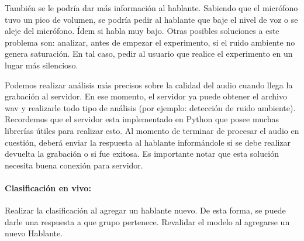 También se le podría dar más información al hablante. Sabiendo que el micrófono tuvo un pico de volumen, se podría pedir al hablante que baje el nivel de voz o se aleje del micrófono. Ídem si habla muy bajo. Otras posibles soluciones a este problema son: analizar, antes de empezar el experimento, si el ruido ambiente no genera saturación. En tal caso, pedir al usuario que realice el experimento en un lugar más silencioso. 

Podemos realizar análisis más precisos sobre la calidad del audio cuando llega la grabación al servidor. En ese momento, el servidor ya puede obtener el archivo wav y realizarle todo tipo de análisis (por ejemplo: detección de ruido ambiente). Recordemos que el servidor esta implementado en Python que posee muchas librerías útiles para realizar esto. Al momento de terminar de procesar el audio en cuestión, deberá enviar la respuesta al hablante informándole si se debe realizar devuelta la grabación o si fue exitosa. Es importante notar que esta solución necesita buena conexión para servidor. 

\paragraph*{Clasificación en vivo:} Realizar la clasificación al agregar un hablante nuevo. De esta forma, se puede darle una respuesta a que grupo pertenece. Revalidar el modelo al agregarse un nuevo Hablante. 
